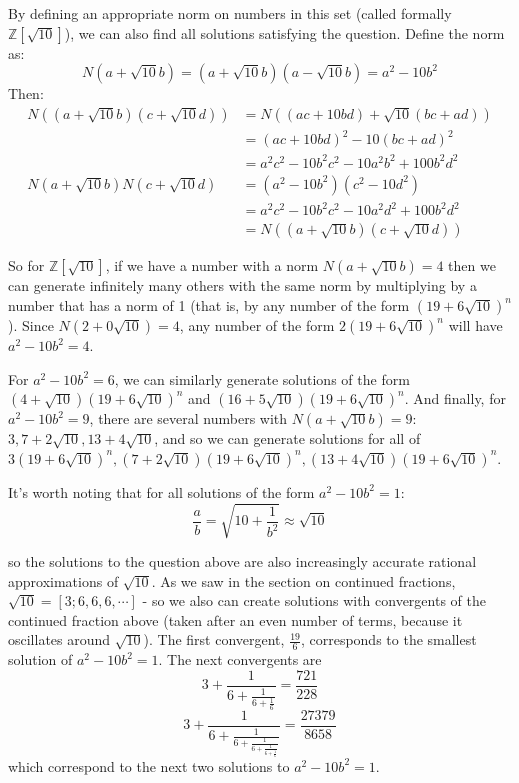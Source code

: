 \documentclass{article}
\begin{document}
By defining an appropriate norm on numbers in this set (called formally $\mathbb{Z}[\sqrt{10}]$), 
we can also find all solutions satisfying the question. Define the norm as:
\[ N(a+\sqrt{10}b) = (a+\sqrt{10}b)(a-\sqrt{10}b) = a^2-10b^2 \]
Then:
\begin{align*}
	N((a+\sqrt{10}b)(c+\sqrt{10}d)) &= N((ac+10bd) + \sqrt{10}(bc + ad)) \\
	&= (ac+10bd)^2-10(bc+ad)^2 \\
	&= a^2c^2 - 10b^2c^2 - 10a^2b^2 + 100b^2d^2 \\
	N(a+\sqrt{10}b)N(c+\sqrt{10}d) &= (a^2-10b^2)(c^2-10d^2) \\
	&= a^2c^2 -10b^2c^2 -10 a^2d^2 +100b^2d^2 \\
	&= N((a+\sqrt{10}b)(c+\sqrt{10}d))
\end{align*}

So for $\mathbb{Z}[\sqrt{10}]$, if we have a number with a norm $N(a+\sqrt{10}b) = 4$ then we can
generate infinitely many others with the same norm by multiplying by a number that has a norm of 1
(that is, by any number of the form $(19+6\sqrt{10})^n$). Since $N(2 + 0\sqrt{10}) = 4$, any number
of the form $2(19+6\sqrt{10})^n$ will have $a^2-10b^2 = 4$.

For $a^2 - 10b^2 = 6$, we can similarly generate solutions of the form $(4+\sqrt{10})(19+6\sqrt{10})^n$
and $(16+5\sqrt{10})(19+6\sqrt{10})^n$. And finally, for $a^2 - 10b^2 = 9$, there are several numbers with
$N(a+\sqrt{10}b) = 9$: $3, 7+2\sqrt{10}, 13 + 4\sqrt{10}$, and so we can generate solutions for all of
$3(19 + 6\sqrt{10})^n, (7 + 2\sqrt{10})(19 + 6\sqrt{10})^n, (13 + 4\sqrt{10})(19 + 6\sqrt{10})^n$.

It's worth noting that for all solutions of the form $a^2-10b^2 = 1$:
\[ \frac{a}{b} = \sqrt{10 + \frac{1}{b^2}} \approx \sqrt{10} \]

so the solutions to the question above are also increasingly accurate rational approximations of 
$\sqrt{10}$. As we saw in the section on continued fractions, $\sqrt{10} = [3;6,6,6,\cdots]$ - so we
also can create solutions with convergents of the continued fraction above (taken after an
even number of terms, because it oscillates around $\sqrt{10}$). The first convergent,
$\frac{19}{6}$, corresponds to the smallest solution of $a^2-10b^2=1$. The next convergents are
\[ 3 + \frac{1}{6 + \frac{1}{6 + \frac{1}{6}}} = \frac{721}{228} \]
\[ 3 + \frac{1}{6 + \frac{1}{6 + \frac{1}{6 + \frac{1}{6 + \frac{1}{6}}}}} = \frac{27379}{8658} \]
which correspond to the next two solutions to $a^2-10b^2=1$.
\end{document}
